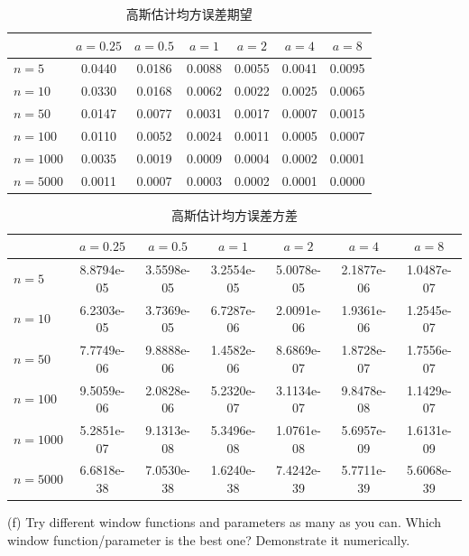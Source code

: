 \documentclass{article}
\begin{document}
\begin{table}[htbp]
  \centering
  \begin{tabular}{l|cccccc}
  \hline
           & $a=0.25$ & $a=0.5$ & $a=1$  & $a=2$  & $a=4$  & $a=8$  \\ \hline
  $n=5$    & 0.0440   & 0.0186  & 0.0088 & 0.0055 & 0.0041 & 0.0095 \\
  $n=10$   & 0.0330   & 0.0168  & 0.0062 & 0.0022 & 0.0025 & 0.0065 \\
  $n=50$   & 0.0147   & 0.0077  & 0.0031 & 0.0017 & 0.0007 & 0.0015 \\
  $n=100$  & 0.0110   & 0.0052  & 0.0024 & 0.0011 & 0.0005 & 0.0007 \\
  $n=1000$ & 0.0035   & 0.0019  & 0.0009 & 0.0004 & 0.0002 & 0.0001 \\
  $n=5000$ & 0.0011   & 0.0007  & 0.0003 & 0.0002 & 0.0001 & 0.0000 \\ \hline
  \end{tabular}
  \caption{高斯估计均方误差期望}
  \label{tab:gauMeanMSE}
\end{table}

\begin{table}[htbp]
  \centering
  \begin{tabular}{l|cccccc}
  \hline
           & $a=0.25$   & $a=0.5$    & $a=1$      & $a=2$      & $a=4$      & $a=8$      \\ \hline
  $n=5$    & 8.8794e-05 & 3.5598e-05 & 3.2554e-05 & 5.0078e-05 & 2.1877e-06 & 1.0487e-07 \\
  $n=10$   & 6.2303e-05 & 3.7369e-05 & 6.7287e-06 & 2.0091e-06 & 1.9361e-06 & 1.2545e-07 \\
  $n=50$   & 7.7749e-06 & 9.8888e-06 & 1.4582e-06 & 8.6869e-07 & 1.8728e-07 & 1.7556e-07 \\
  $n=100$  & 9.5059e-06 & 2.0828e-06 & 5.2320e-07 & 3.1134e-07 & 9.8478e-08 & 1.1429e-07 \\
  $n=1000$ & 5.2851e-07 & 9.1313e-08 & 5.3496e-08 & 1.0761e-08 & 5.6957e-09 & 1.6131e-09 \\
  $n=5000$ & 6.6818e-38 & 7.0530e-38 & 1.6240e-38 & 7.4242e-39 & 5.7711e-39 & 5.6068e-39 \\ \hline
  \end{tabular}
  \caption{高斯估计均方误差方差}
  \label{tab:gauVarMSE}
\end{table}

(f) Try different window functions and parameters as many as you can. Which window function/parameter is the best one? Demonstrate it numerically.
\end{document}
